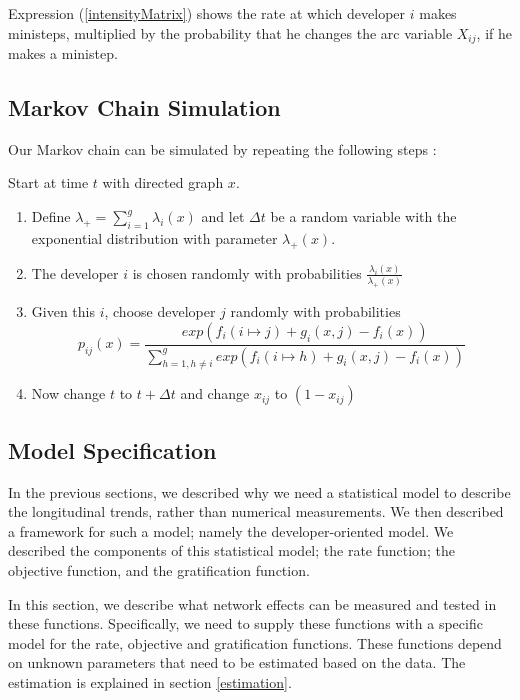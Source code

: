 \documentclass[12pt,letterpaper]{gthesis2}  %
\begin{document}
Expression (\ref{intensityMatrix}) shows the rate at which developer $i$ makes ministeps, multiplied by the probability that he changes the arc variable $X_{ij}$, if he makes a ministep.\\

\subsection*{Markov Chain Simulation}
\label{MarkovChainSimulationSteps}
Our Markov chain can be simulated by repeating the following steps \cite{Snijders2004}:

Start at time $t$ with directed graph $x$. 
\begin{enumerate}
\item Define $\lambda_{+} = \sum_{i=1}^g \lambda_i(x)$ and let $\Delta t$ be a random variable with the exponential distribution with parameter $\lambda_{+}(x)$.
\item The developer $i$ is chosen randomly with probabilities $\frac{\lambda_{i}(x)}{\lambda_{+}(x)}$
\item Given this $i$, choose developer $j$ randomly with probabilities 
\begin{equation}
p_{ij}(x) = \frac{exp(f_i(i \mapsto j) + g_i(x, j) - f_i(x))}{\sum_{h=1, h \neq i}^{g} exp(f_i(i \mapsto h) + g_i(x, j) - f_i(x))} \nonumber
\end{equation}
\item Now change $t$ to $t + \Delta t$ and change $x_{ij}$ to $(1 - x_{ij})$
\end{enumerate}

\subsection*{Model Specification}
In the previous sections, we described why we need a statistical model to describe the longitudinal trends, rather than numerical measurements. We then described a framework for such a model; namely the developer-oriented model. We described the components of this statistical model; the rate function; the objective function, and the gratification function.

In this section, we describe what network effects can be measured and tested in these functions. Specifically, we need to supply these functions with a specific model for the rate, objective and gratification functions. These functions depend on unknown parameters that need to be estimated based on the data. The estimation is explained in section \ref{estimation}. 
\end{document}
